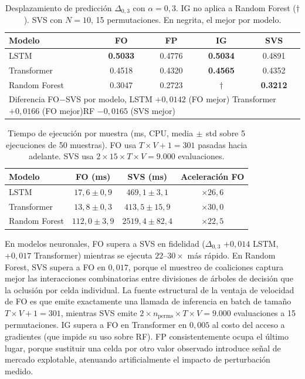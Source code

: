 \documentclass[conference, letterpaper]{IEEEtran}
\begin{document}
\begin{table}[h]
\centering
\caption{Desplazamiento de predicción $\Delta_{0{,}3}$ con
         $\alpha{=}0{,}3$. IG no aplica a Random Forest ($\dagger$).
         SVS con $N{=}10$, 15 permutaciones. En negrita, el mejor por modelo.}
\label{tab:exp3_shift}
\begin{tabular}{lcccc}
\toprule
\textbf{Modelo} & \textbf{FO} & \textbf{FP}
                & \textbf{IG} & \textbf{SVS} \\
\midrule
LSTM          & \textbf{0.5033} & 0.4776 & \textbf{0.5034} & 0.4891 \\
Transformer   & 0.4518          & 0.4320 & \textbf{0.4565} & 0.4352 \\
Random Forest & 0.3047          & 0.2723 & $\dagger$        & \textbf{0.3212} \\
\midrule
\multicolumn{5}{l}{\small Diferencia FO$-$SVS por modelo, LSTM $+0{,}0142$ (FO mejor)\quad
  Transformer $+0{,}0166$ (FO mejor)\quad RF $-0{,}0165$ (SVS mejor)} \\
\bottomrule
\end{tabular}
\end{table}

\begin{table}[h]
\centering
\caption{Tiempo de ejecución por muestra (ms, CPU, media$\,\pm\,$std
         sobre 5 ejecuciones de 50 muestras).
         FO usa $T{\times}V{+}1{=}301$ pasadas hacia adelante.
         SVS usa $2{\times}15{\times}T{\times}V{=}9{.}000$ evaluaciones.}
\label{tab:timing}
\begin{tabular}{lccc}
\toprule
\textbf{Modelo} & \textbf{FO (ms)} & \textbf{SVS (ms)}
               & \textbf{Aceleración FO} \\
\midrule
LSTM          & $17{,}6\pm0{,}9$   & $469{,}1\pm3{,}1$   & ${\times}26{,}6$ \\
Transformer   & $13{,}8\pm0{,}3$   & $413{,}5\pm15{,}9$  & ${\times}30{,}0$ \\
Random Forest & $112{,}0\pm3{,}9$  & $2519{,}4\pm82{,}4$ & ${\times}22{,}5$ \\
\bottomrule
\end{tabular}
\end{table}

En modelos neuronales, FO supera a SVS en fidelidad ($\Delta_{0{,}3}$
$+0{,}014$ LSTM, $+0{,}017$ Transformer) mientras se ejecuta
$22$--$30{\times}$ más rápido. En Random Forest, SVS supera a FO en
$0{,}017$, porque el muestreo de coaliciones captura mejor las interacciones
combinatorias entre divisiones de árboles de decisión que la oclusión
por celda individual. La fuente estructural de la ventaja de velocidad
de FO es que emite exactamente una llamada de inferencia en batch de
tamaño $T{\times}V{+}1{=}301$, mientras SVS emite
$2{\times}n_{\text{perms}}{\times}T{\times}V{=}9{.}000$ evaluaciones
a 15 permutaciones. IG supera a FO en Transformer en $0{,}005$ al
costo del acceso a gradientes (que impide su uso sobre RF). FP
consistentemente ocupa el último lugar, porque sustituir una celda por otro
valor observado introduce señal de mercado explotable, atenuando
artificialmente el impacto de perturbación medido.
\end{document}
